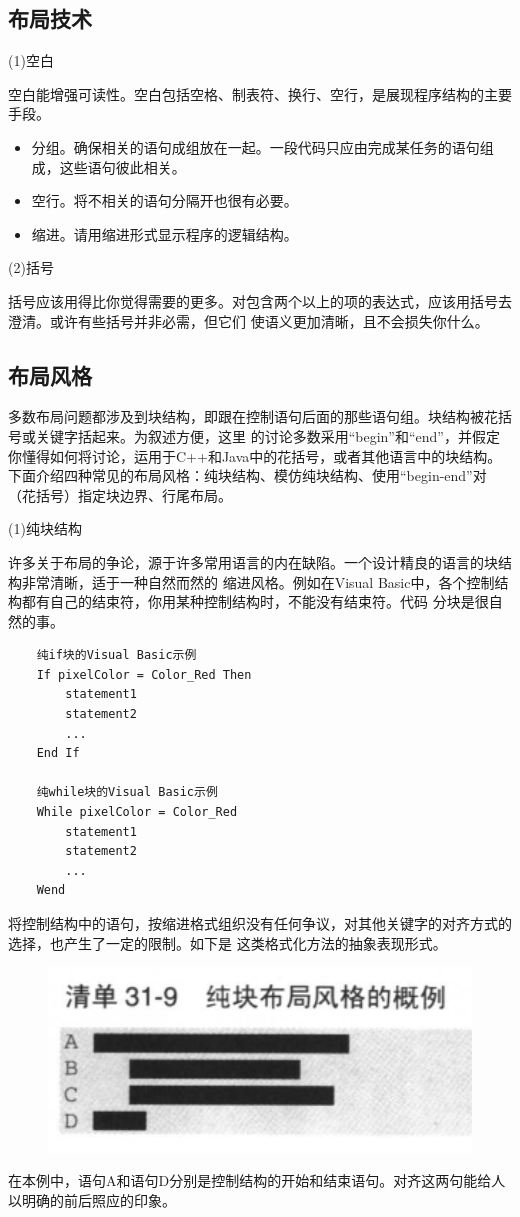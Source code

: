 \documentclass{article}
\begin{document}
\subsection{布局技术}
\par
(1)空白
\par
空白能增强可读性。空白包括空格、制表符、换行、空行，是展现程序结构的主要手段。
\begin{itemize}
    \item 分组。确保相关的语句成组放在一起。一段代码只应由完成某任务的语句组成，这些语句彼此相关。
    \item 空行。将不相关的语句分隔开也很有必要。
    \item 缩进。请用缩进形式显示程序的逻辑结构。
\end{itemize}

\par
(2)括号
\par
括号应该用得比你觉得需要的更多。对包含两个以上的项的表达式，应该用括号去澄清。或许有些括号并非必需，但它们
使语义更加清晰，且不会损失你什么。

\subsection{布局风格}
多数布局问题都涉及到块结构，即跟在控制语句后面的那些语句组。块结构被花括号或关键字括起来。为叙述方便，这里
的讨论多数采用“begin”和“end”，并假定你懂得如何将讨论，运用于C++和Java中的花括号，或者其他语言中的块结构。
下面介绍四种常见的布局风格：纯块结构、模仿纯块结构、使用“begin-end”对（花括号）指定块边界、行尾布局。
\par
(1)纯块结构
\par
许多关于布局的争论，源于许多常用语言的内在缺陷。一个设计精良的语言的块结构非常清晰，适于一种自然而然的
缩进风格。例如在Visual Basic中，各个控制结构都有自己的结束符，你用某种控制结构时，不能没有结束符。代码
分块是很自然的事。
\begin{lstlisting}
    纯if块的Visual Basic示例
    If pixelColor = Color_Red Then
        statement1
        statement2
        ...
    End If

    纯while块的Visual Basic示例
    While pixelColor = Color_Red
        statement1
        statement2
        ...
    Wend
\end{lstlisting}
将控制结构中的语句，按缩进格式组织没有任何争议，对其他关键字的对齐方式的选择，也产生了一定的限制。如下是
这类格式化方法的抽象表现形式。
\begin{figure}[htb]
    \centering
    \includegraphics[width=15cm]{figure32.png}
\end{figure}
在本例中，语句A和语句D分别是控制结构的开始和结束语句。对齐这两句能给人以明确的前后照应的印象。
\end{document}
